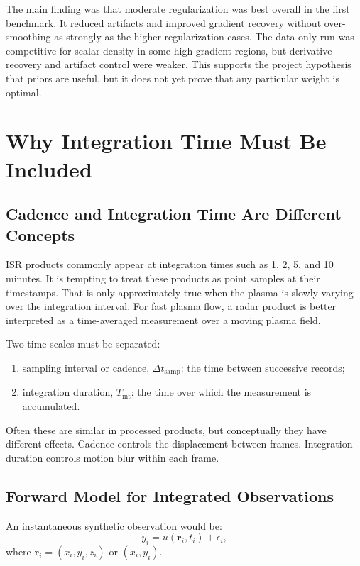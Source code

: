 \documentclass[11pt]{article}
\begin{document}
The main finding was that moderate regularization was best overall in the first benchmark. It
reduced artifacts and improved gradient recovery without over-smoothing as strongly as the higher
regularization cases. The data-only run was competitive for scalar density in some high-gradient
regions, but derivative recovery and artifact control were weaker. This supports the project
hypothesis that priors are useful, but it does not yet prove that any particular weight is optimal.

\section{Why Integration Time Must Be Included}

\subsection{Cadence and Integration Time Are Different Concepts}

ISR products commonly appear at integration times such as 1, 2, 5, and 10 minutes. It is tempting
to treat these products as point samples at their timestamps. That is only approximately true when
the plasma is slowly varying over the integration interval. For fast plasma flow, a radar product is
better interpreted as a time-averaged measurement over a moving plasma field.

Two time scales must be separated:
\begin{enumerate}[leftmargin=*]
  \item sampling interval or cadence, $\Delta t_{\mathrm{samp}}$: the time between successive records;
  \item integration duration, $T_{\mathrm{int}}$: the time over which the measurement is accumulated.
\end{enumerate}

Often these are similar in processed products, but conceptually they have different effects.
Cadence controls the displacement between frames. Integration duration controls motion blur within
each frame.

\subsection{Forward Model for Integrated Observations}

An instantaneous synthetic observation would be:
\begin{equation}
  y_i = u(\mathbf{r}_i,t_i) + \epsilon_i,
\end{equation}
where $\mathbf{r}_i=(x_i,y_i,z_i)$ or $(x_i,y_i)$.
\end{document}

